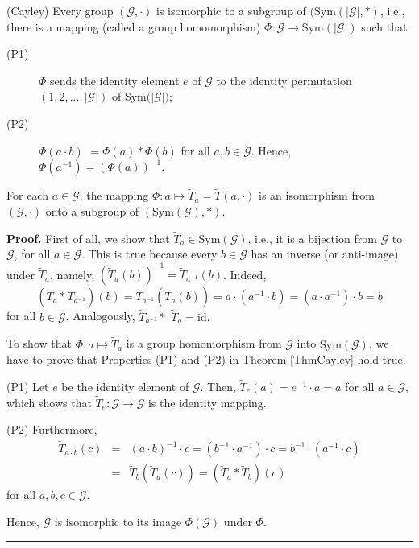 \documentclass[10pt,a4paper]{amsart}
\newenvironment{proof}[1][Proof]{\noindent\textbf{#1.} }{\ \rule{0.5em}{0.5em}}
\begin{document}
\begin{theorem}
\label{ThmCayley}(Cayley) Every group $(\mathcal{G},\cdot )$ is isomorphic
to a subgroup of $(\mathrm{Sym}(\left\vert \mathcal{G}\right\vert ,\ast )$,
i.e., there is a mapping (called a group homomorphism) $\Phi :\mathcal{G}%
\rightarrow \mathrm{Sym}(\left\vert \mathcal{G}\right\vert )$ such that

\begin{description}
\item[(P1)] $\Phi $ sends the identity element $e$ of $\mathcal{G}$ to the
identity permutation $(1,2,...,\left\vert \mathcal{G}\right\vert )$ of $%
\mathrm{Sym}(\left\vert \mathcal{G}\right\vert \mathcal{)}$;

\item[(P2)] $\Phi (a\cdot b)$ $=\Phi (a)\ast \Phi (b)$ for all $a,b\in 
\mathcal{G}$. Hence, $\Phi (a^{-1})=(\Phi (a))^{-1}$.
\end{description}
\end{theorem}

\begin{theorem}
\label{ThmCayleyViaTranscripts}For each $a\in \mathcal{G}$, the mapping $%
\Phi :a\mapsto \tilde{T}_{a}=\tilde{T}(a,\cdot )$ is an isomorphism from $(%
\mathcal{G},\cdot )$ onto a subgroup of $(\mathrm{Sym}(\mathcal{G}),\ast )$.
\end{theorem}

\begin{proof}
First of all, we show that $\tilde{T}_{a}\in \mathrm{Sym}(\mathcal{G})$,
i.e., it is a bijection from $\mathcal{G}$ to $\mathcal{G}$, for all $a\in 
\mathcal{G}$. This is true because every $b\in \mathcal{G}$ has an inverse
(or anti-image) under $\tilde{T}_{a}$, namely, $(\tilde{T}_{a}(b))^{-1}=%
\tilde{T}_{a^{-1}}(b)$. Indeed,%
\begin{equation*}
(\tilde{T}_{a}\ast \tilde{T}_{a^{-1}})(b)=\tilde{T}_{a^{-1}}(\tilde{T}%
_{a}(b))=a\cdot (a^{-1}\cdot b)=(a\cdot a^{-1})\cdot b=b
\end{equation*}%
for all $b\in \mathcal{G}$. Analogously, $\tilde{T}_{a^{-1}}\ast $ $\tilde{T}%
_{a}=\mathrm{id}.$

To show that $\Phi :a\mapsto \tilde{T}_{a}$ is a group homomorphism from $%
\mathcal{G}$ into $\mathrm{Sym}(\mathcal{G})$, we have to prove that
Properties (P1) and (P2) in Theorem \ref{ThmCayley} hold true.

(P1) Let $e$ be the identity element of $\mathcal{G}$. Then, $\tilde{T}%
_{e}(a)=e^{-1}\cdot a=a$ for all $a\in \mathcal{G}$, which shows that $%
\tilde{T}_{e}:\mathcal{G}\rightarrow \mathcal{G}$ is the identity mapping.

(P2) Furthermore,%
\begin{eqnarray*}
\tilde{T}_{a\cdot b}(c) &=&(a\cdot b)^{-1}\cdot c=(b^{-1}\cdot a^{-1})\cdot
c=b^{-1}\cdot (a^{-1}\cdot c) \\
&=&\tilde{T}_{b}(\tilde{T}_{a}(c))=(\tilde{T}_{a}\ast \tilde{T}_{b})(c)
\end{eqnarray*}%
for all $a,b,c\in \mathcal{G}$.

Hence, $\mathcal{G}$ is isomorphic to its image $\Phi (\mathcal{G})$ under $%
\Phi $.
\end{proof}
\end{document}
